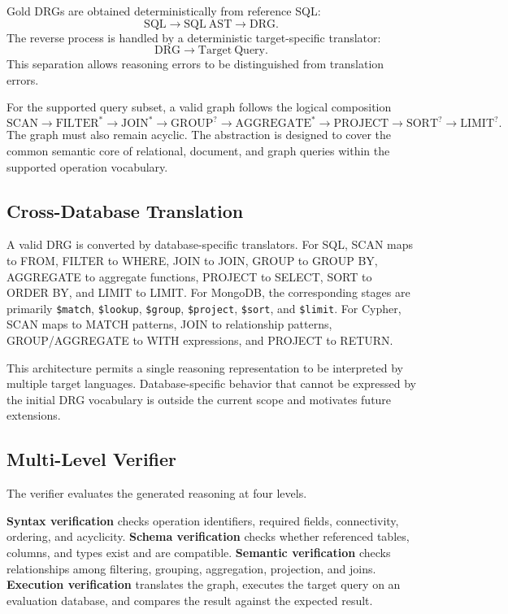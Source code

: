 \documentclass[conference]{IEEEtran}
\begin{document}
Gold DRGs are obtained deterministically from reference SQL:
\begin{equation}
\mathrm{SQL}\rightarrow\mathrm{SQL\ AST}\rightarrow\mathrm{DRG}.
\end{equation}
The reverse process is handled by a deterministic target-specific translator:
\begin{equation}
\mathrm{DRG}\rightarrow\mathrm{Target\ Query}.
\end{equation}
This separation allows reasoning errors to be distinguished from translation errors.

For the supported query subset, a valid graph follows the logical composition
\begin{equation}
\mathrm{SCAN}\rightarrow\mathrm{FILTER}^{*}\rightarrow\mathrm{JOIN}^{*}
\rightarrow\mathrm{GROUP}^{?}\rightarrow\mathrm{AGGREGATE}^{*}
\rightarrow\mathrm{PROJECT}\rightarrow\mathrm{SORT}^{?}\rightarrow\mathrm{LIMIT}^{?}.
\end{equation}
The graph must also remain acyclic. The abstraction is designed to cover the common semantic core of relational, document, and graph queries within the supported operation vocabulary.

\subsection{Cross-Database Translation}
A valid DRG is converted by database-specific translators. For SQL, SCAN maps to FROM, FILTER to WHERE, JOIN to JOIN, GROUP to GROUP BY, AGGREGATE to aggregate functions, PROJECT to SELECT, SORT to ORDER BY, and LIMIT to LIMIT. For MongoDB, the corresponding stages are primarily \texttt{\$match}, \texttt{\$lookup}, \texttt{\$group}, \texttt{\$project}, \texttt{\$sort}, and \texttt{\$limit}. For Cypher, SCAN maps to MATCH patterns, JOIN to relationship patterns, GROUP/AGGREGATE to WITH expressions, and PROJECT to RETURN.

This architecture permits a single reasoning representation to be interpreted by multiple target languages. Database-specific behavior that cannot be expressed by the initial DRG vocabulary is outside the current scope and motivates future extensions.

\subsection{Multi-Level Verifier}
The verifier evaluates the generated reasoning at four levels.

\textbf{Syntax verification} checks operation identifiers, required fields, connectivity, ordering, and acyclicity. \textbf{Schema verification} checks whether referenced tables, columns, and types exist and are compatible. \textbf{Semantic verification} checks relationships among filtering, grouping, aggregation, projection, and joins. \textbf{Execution verification} translates the graph, executes the target query on an evaluation database, and compares the result against the expected result.
\end{document}
